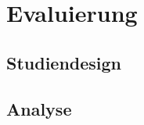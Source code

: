 
\chapter{Evaluierung}
\label{ch:Evaluierung}


\section{Studiendesign}
\label{ch:Implementierung:sec:Studiendesign}




\section{Analyse}
\label{ch:Evaluierung:sec:Abschnitt1}





